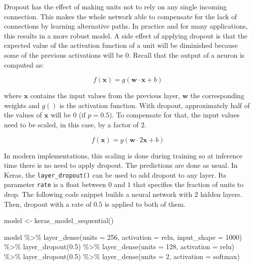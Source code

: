 \documentclass[
  11pt,
]{krantz}
\newenvironment{Shaded}{\begin{snugshade}}{\end{snugshade}}
\newcommand{\AttributeTok}[1]{\textcolor[rgb]{0.61,0.61,0.61}{#1}}
\newcommand{\DecValTok}[1]{\textcolor[rgb]{0.06,0.06,0.06}{#1}}
\newcommand{\FloatTok}[1]{\textcolor[rgb]{0.06,0.06,0.06}{#1}}
\newcommand{\FunctionTok}[1]{\textcolor[rgb]{0,0,0}{#1}}
\newcommand{\NormalTok}[1]{#1}
\newcommand{\OtherTok}[1]{\textcolor[rgb]{0.37,0.37,0.37}{#1}}
\newcommand{\SpecialCharTok}[1]{\textcolor[rgb]{0,0,0}{#1}}
\newcommand{\StringTok}[1]{\textcolor[rgb]{0.5,0.5,0.5}{#1}}
\begin{document}
Dropout has the effect of making units not to rely on any single incoming connection. This makes the whole network able to compensate for the lack of connections by learning alternative paths. In practice and for many applications, this results in a more robust model. A side effect of applying dropout is that the expected value of the activation function of a unit will be diminished because some of the previous activations will be \(0\). Recall that the output of a neuron is computed as:

\begin{equation}
  f(\boldsymbol{x}) = g(\boldsymbol{w} \cdot \boldsymbol{x} + b)
\end{equation}

where \(\boldsymbol{x}\) contains the input values from the previous layer, \(\boldsymbol{w}\) the corresponding weights and \(g()\) is the activation function. With dropout, approximately half of the values of \(\boldsymbol{x}\) will be \(0\) (if \(p=0.5\)). To compensate for that, the input values need to be scaled, in this case, by a factor of \(2\).

\begin{equation}
  f(\boldsymbol{x}) = g(\boldsymbol{w} \cdot 2 \boldsymbol{x} + b)
\end{equation}

In modern implementations, this scaling is done during training so at inference time
there is no need to apply dropout. The predictions are done as usual. In Keras, the \texttt{layer\_dropout()} can be used to add dropout to any layer. Its parameter \texttt{rate} is a float between \(0\) and \(1\) that specifies the fraction of units to drop. The following code snippet builds a neural network with \(2\) hidden layers. Then, dropout with a rate of \(0.5\) is applied to both of them.

\begin{Shaded}
\begin{Highlighting}[]
\NormalTok{model }\OtherTok{\textless{}{-}} \FunctionTok{keras\_model\_sequential}\NormalTok{()}
  
\NormalTok{  model }\SpecialCharTok{\%\textgreater{}\%}
    \FunctionTok{layer\_dense}\NormalTok{(}\AttributeTok{units =} \DecValTok{256}\NormalTok{, }\AttributeTok{activation =} \StringTok{\textquotesingle{}relu\textquotesingle{}}\NormalTok{, }\AttributeTok{input\_shape =} \DecValTok{1000}\NormalTok{) }\SpecialCharTok{\%\textgreater{}\%} 
    \FunctionTok{layer\_dropout}\NormalTok{(}\FloatTok{0.5}\NormalTok{) }\SpecialCharTok{\%\textgreater{}\%}
    \FunctionTok{layer\_dense}\NormalTok{(}\AttributeTok{units =} \DecValTok{128}\NormalTok{, }\AttributeTok{activation =} \StringTok{\textquotesingle{}relu\textquotesingle{}}\NormalTok{) }\SpecialCharTok{\%\textgreater{}\%}
    \FunctionTok{layer\_dropout}\NormalTok{(}\FloatTok{0.5}\NormalTok{) }\SpecialCharTok{\%\textgreater{}\%}
    \FunctionTok{layer\_dense}\NormalTok{(}\AttributeTok{units =} \DecValTok{2}\NormalTok{, }\AttributeTok{activation =} \StringTok{\textquotesingle{}softmax\textquotesingle{}}\NormalTok{)}
\end{Highlighting}
\end{Shaded}
\end{document}
